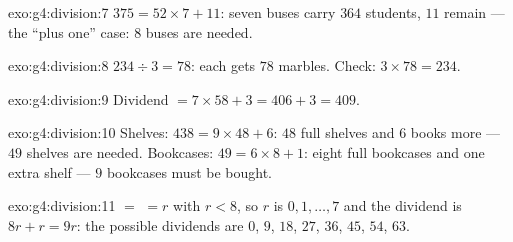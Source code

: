 \begin{solution}{exo:g4:division:7}
$375 = 52 \times 7 + 11$: seven buses carry $364$ students, $11$
remain --- the ``plus one'' case: $8$ buses are needed.
\end{solution}

\begin{solution}{exo:g4:division:8}
$234 \div 3 = 78$: each gets $78$ marbles. Check:
$3 \times 78 = 234$.
\end{solution}

\begin{solution}{exo:g4:division:9}
Dividend $= 7 \times 58 + 3 = 406 + 3 = 409$.
\end{solution}

\begin{solution}{exo:g4:division:10}
Shelves: $438 = 9 \times 48 + 6$: $48$ full shelves and $6$ books
more --- $49$ shelves are needed. Bookcases:
$49 = 6 \times 8 + 1$: eight full bookcases and one extra shelf ---
$9$ bookcases must be bought.
\end{solution}

\begin{solution}{exo:g4:division:11}
 $=$  $= r$ with $r < 8$, so $r$ is $0, 1, \dots,
7$ and the dividend is $8r + r = 9r$: the possible dividends are
$0$, $9$, $18$, $27$, $36$, $45$, $54$, $63$.
\end{solution}
